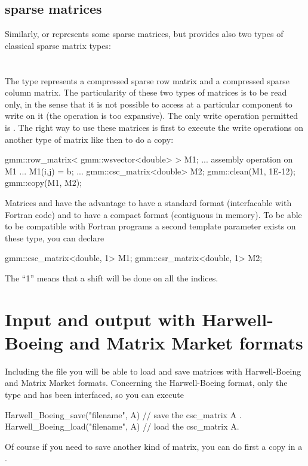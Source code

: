 \documentclass[11pt,a4paper]{article}
\begin{document}
\subsection{sparse matrices}
Similarly,  or  represents some sparse matrices, but \gmm provides also two types of classical sparse matrix types:  \\[0.2cm]
  \\
  \\[0.2cm]
The type  represents a compressed sparse row matrix and  a compressed sparse column matrix. The particularity of these two types of matrices is to be read only, in the sense that it is not possible to access at a particular component to write on it (the operation is too expansive). The only write operation permitted is . The right way to use these matrices is first to execute the write operations on another type of matrix like  then to do a copy:
\begin{cppcode}
  gmm::row_matrix< gmm::wsvector<double> > M1;
  ...
  assembly operation on M1
  ...
  M1(i,j) = b;
  ...
  gmm::csc_matrix<double> M2;
  gmm::clean(M1, 1E-12);
  gmm::copy(M1, M2);
\end{cppcode}
Matrices  and  have the advantage to have a standard format (interfacable with Fortran code) and to have a compact format (contiguous in memory). To be able to be compatible with Fortran programs a second template parameter exists on these type, you can declare
\begin{cppcode}
  gmm::csc_matrix<double, 1> M1;
  gmm::csr_matrix<double, 1> M2;
\end{cppcode}
The ``1'' means that a shift will be done on all the indices.

\section{Input and output with Harwell-Boeing and Matrix Market formats}
Including the file  you will be able to load and save matrices with Harwell-Boeing and Matrix Market formats. Concerning the Harwell-Boeing format, only the type  and  has been interfaced, so you can execute
\begin{cppcode}
Harwell_Boeing_save("filename", A) // save the csc_matrix A .
Harwell_Boeing_load("filename", A) // load the csc_matrix A.
\end{cppcode}
Of course if you need to save another kind of matrix, you can do first a copy in a .
\end{document}
